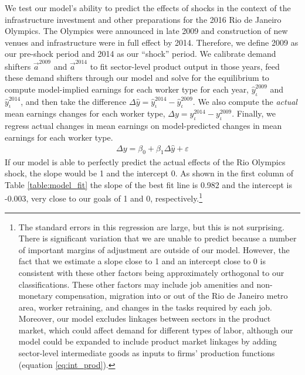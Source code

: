 \documentclass[12pt]{article}
\def\i{\iota}
\theoremstyle{definition}
\theoremstyle{plain}
\def\ve{\varepsilon}
\begin{document}
We test our model's ability to predict the effects of shocks in the context of the infrastructure investment and other preparations for the 2016 Rio de Janeiro Olympics. The Olympics were announced in late 2009 and construction of new venues and infrastructure were in full effect by 2014. Therefore, we define 2009 as our pre-shock period and 2014 as our ``shock'' period. We calibrate demand shifters $\vec{a}^{2009}$ and $\vec{a}^{2014}$ to fit sector-level product output in those years, feed these demand shifters through our model and solve for the equilibrium to compute model-implied earnings for each worker type for each year, $\hat y_\i^{2009}$ and $\hat y_\i^{2014}$, and then take the difference $\Delta\hat y = \hat y_\i^{2014}-\hat y_\i^{2009}$. We also compute the \emph{actual} mean earnings changes for each worker type, $\Delta y = y_\i^{2014}- y_\i^{2009}$. Finally, we regress actual changes in mean earnings on model-predicted changes in mean earnings for each worker type. 
\begin{align}
	\Delta y  = \beta_0 + \beta_1 \Delta\hat y + \ve \label{eq:model_fit_reg}
\end{align}
If our model is able to perfectly predict the actual effects of the Rio Olympics shock, the slope would be 1 and the intercept 0. As shown in the first column of Table \ref{table:model_fit} the slope of the best fit line is 0.982 and the intercept is -0.003, very close to our goals of 1 and 0, respectively.\footnote{The standard errors in this regression are large, but this is not surprising. There is significant variation that we are unable to predict because a number of important margins of adjustment are outside of our model. However, the fact that we estimate a slope close to 1 and an intercept close to 0 is consistent with these other factors being approximately orthogonal to our classifications. These other factors may include job amenities and non-monetary compensation, migration into or out of the Rio de Janeiro metro area, worker retraining, and changes in the tasks required by each job. Moreover, our model excludes linkages between sectors in the product market, which could affect demand for different types of labor, although our model could be expanded to include product market linkages by adding sector-level intermediate goods as inputs to firms' production functions (equation \ref{eq:int_prod}).} 

%
\end{document}
